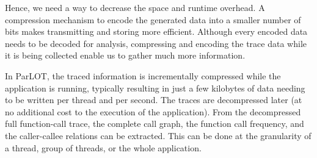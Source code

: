 Hence, we need a way to decrease the space and runtime overhead. A compression mechanism to encode the generated data into a smaller number of bits makes transmitting and storing more efficient. Although every encoded data needs to be decoded for analysis, compressing and encoding the trace data while it is being collected enable us to gather much more information.

In ParLOT, the traced information is incrementally compressed while the application is running, typically resulting in just a few kilobytes of data needing to be written per thread and per second.
The traces are decompressed later (at no additional cost to the  execution of the application). From the decompressed full function-call trace, the complete call graph, the function call frequency, and the caller-callee relations can be extracted. This can be done at the granularity of a thread, group of threads, or the whole application. 
